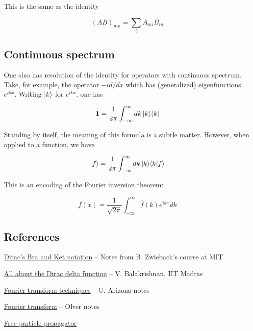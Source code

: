This is the same as the identity

\begin{equation}
(AB)_{mn} = \sum_i A_{mi} B_{in}
\end{equation}

\subsection{Continuous spectrum}

One also has resolution of the identity for operators with continuous spectrum.  Take, for example, the operator $-id/dx$ which has (generalized) eigenfunctions $e^{ikx}$. Writing $| k \rangle$ for $e^{ikx}$, one has

\begin{equation}
{\bf 1} = \frac{1}{2\pi} \int_{-\infty}^\infty dk\, | k \rangle \langle k |
\end{equation}

Standing by itself, the meaning of this formula is a subtle matter.  However, when applied to a function, we have

\begin{equation}
| f \rangle = \frac{1}{2\pi} \int_{-\infty}^\infty dk\, | k \rangle \langle k | f \rangle
\end{equation}

This is an encoding of the Fourier inversion theorem:

\begin{equation}
f(x) = \frac{1}{\sqrt{2\pi}} \int_{-\infty}^\infty \hat f(k) e^{ikx} dk
\end{equation}



\subsection{References}

\href{http://ocw.mit.edu/courses/physics/8-05-quantum-physics-ii-fall-2013/lecture-notes/MIT8_05F13_Chap_04.pdf}{Dirac's Bra and Ket notation} -- Notes from B. Zwiebach's course at MIT

\href{http://www.physics.iitm.ac.in/~labs/dynamical/pedagogy/vb/delta.pdf}{All about the Dirac delta function} -- V. Balakrishnan, IIT Madras

\href{http://math.arizona.edu/~kglasner/math456/fouriertransform.pdf}{Fourier transform techniques} -- U. Arizona notes

\href{https://www.math.utah.edu/~gustafso/s2013/3150/pdeNotes/fourierTransorm-PeterOlver2013.pdf}{Fourier transform} -- Olver notes

\href{http://www.physics.rutgers.edu/~steves/501/Lectures_Final/Lec06_Propagator.pdf}{Free particle propagator}

